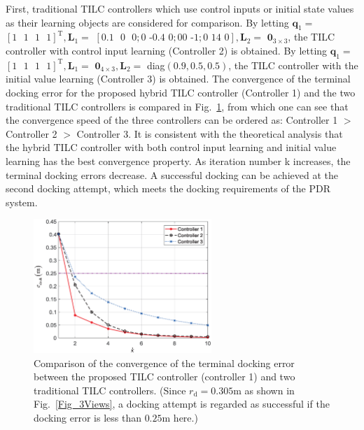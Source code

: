 First, traditional TILC controllers which use control inputs or initial state
values as their learning objects are considered for comparison. By letting
$\mathbf{q}_{1}=$ $\left[  1\text{ }1\text{ }1\text{ }1\right]  ^{\text{T}%
},\mathbf{L}_{1}=$ $\left[  0.1\text{ }0\text{ }0;0\text{ -0.4 }0;0\text{
}0\text{ -1};0\text{ 14 0}\right]  ,\mathbf{L}_{2}=$ $\mathbf{0}_{3\times3}$,
the TILC controller with control input learning (Controller 2) is obtained. By
letting $\mathbf{q}_{1}=$ $\left[  1\text{ }1\text{ }1\text{ }1\right]
^{\text{T}},\mathbf{L}_{1}=$ $\mathbf{0}_{4\times3},\mathbf{L}_{2}=$
diag$\left(  0.9,0.5,0.5\right)  $, the TILC controller with the initial value
learning (Controller 3) is obtained. The convergence of the terminal docking
error for the proposed hybrid TILC controller (Controller 1) and the two
traditional TILC controllers is compared in Fig.~\ref{Fig_DockingError_Comp},
from which one can see that the convergence speed of the three controllers can
be ordered as: Controller 1 $>$ Controller 2 $>$ Controller 3. It is
consistent with the theoretical analysis that the hybrid TILC controller with
both control input learning and initial value learning has the best
convergence property. As iteration number k increases, the terminal docking errors decrease. A successful docking can be achieved at the second
docking attempt, which meets the docking requirements of the PDR
system.\begin{figure}[pth]
	\begin{centering}
		\includegraphics[width=0.6\textwidth]{Figures/Figs_Ch10/DockingError_Comp} 
		\par \end{centering}
	\caption{Comparison of the convergence of the terminal docking error between the proposed TILC controller (controller 1) and two traditional TILC controllers. (Since $r_{\text{d}%
		}=0.305$m as shown in Fig.~\ref{Fig_3Views}, a docking attempt is regarded
		as successful if the docking error is less than $0.25$m here.) }%
	\label{Fig_DockingError_Comp}%
\end{figure}

